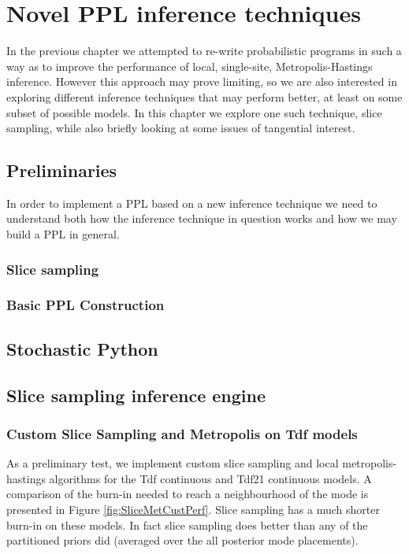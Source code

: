 \chapter{Novel PPL inference techniques}
\label{chap:infEngines}

In the previous chapter we attempted to re-write probabilistic programs in such a way as to improve the performance of local, single-site, Metropolis-Hastings inference. However this approach may prove limiting, so we are also interested in exploring different inference techniques that may perform better, at least on some subset of possible models. In this chapter we explore one such technique, slice sampling, while also briefly looking at some issues of tangential interest.

\section{Preliminaries}
In order to implement a PPL based on a new inference technique we need to understand both how the inference technique in question works and how we may build a PPL in general.

\subsection{Slice sampling}
\label{sect:sliceBack}

\subsection{Basic PPL Construction}

\section{Stochastic Python}
\label{sect:StocPy}

\section{Slice sampling inference engine}
\subsection{Custom Slice Sampling and Metropolis on Tdf models}

As a preliminary test, we implement custom slice sampling and local metropolis-hastings algorithms for the Tdf continuous and Tdf21 continuous models. A comparison of the burn-in needed to reach a neighbourhood of the mode is presented in Figure \ref{fig:SliceMetCustPerf}. Slice sampling has a much shorter burn-in on these models. In fact slice sampling does better than any of the partitioned priors did (averaged over the all posterior mode placements).

